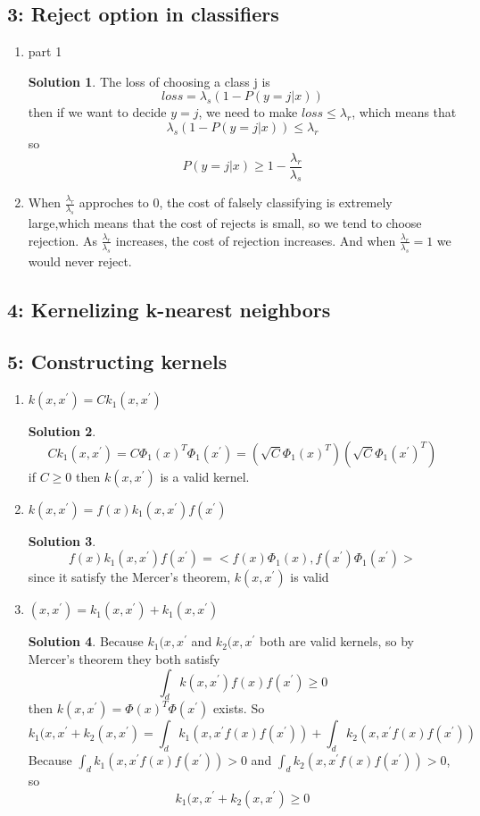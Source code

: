 \documentclass[]{book}
\theoremstyle{definition}
\newtheorem*{soln}{Solution}
\begin{document}
\subsection*{3: Reject option in classifiers  }
\begin{enumerate}
	\item part 1
	\begin{soln}
		The loss of choosing a class j is 
		$$loss = \lambda_s (1 - P(y = j | x))$$
		then if we want to decide $y=j$, we need to make $loss \leq \lambda_r$, which means that
		$$\lambda_s(1 - P(y = j | x))\leq \lambda_r$$
		so
		$$ P(y = j | x)\geq 1- \frac{\lambda_r}{\lambda_s}$$
	\end{soln}
	\item When $\frac{\lambda_r}{\lambda_s}$ approches to 0, the cost of falsely classifying is extremely large,which means that the cost of rejects is small, so we tend to choose rejection.
	As  $\frac{\lambda_r}{\lambda_s}$ increases, the cost of rejection increases. And when $\frac{\lambda_r}{\lambda_s} = 1$ we would never reject.
\end{enumerate}
\subsection*{4: Kernelizing k-nearest neighbors  }
\subsection*{5: Constructing kernels  }
\begin{enumerate}
	\item $k(x,x^{'}) = C k_1(x,x^{'})$
	\begin{soln}
		$$C k_1(x,x^{'}) = C \Phi_1(x)^T \Phi_1(x^{'}) = (\sqrt{C}\Phi_1(x)^T)(\sqrt{C}\Phi_1(x^{'})^T)$$
		if $C\geq0$ then $k(x,x^{'})$ is a valid kernel.
	\end{soln}
	\item $k(x,x^{'}) = f(x) k_1(x,x^{'}) f(x^{'})$
	\begin{soln}
		$$f(x) k_1(x,x^{'})f(x^{'}) = <f(x)\Phi_1(x),  f(x^{'})\Phi_1(x^{'})>$$
		since it satisfy the Mercer's theorem, $k(x,x^{'})$ is valid
	\end{soln} 
	\item $(x,x^{'}) = k_1(x,x^{'}) + k_1(x,x^{'})$
	\begin{soln}
		Because $k_1(x,x^{'}$ and $k_2(x,x^{'}$ both are valid kernels, so by Mercer's theorem they both satisfy
		$$\int_d k(x,x^{'})f(x)f(x^{'})\geq0$$
		then $k(x,x^{'}) = \Phi(x)^T \Phi(x^{'})$ exists.
		So 
		$$k_1(x,x^{'} + k_2(x,x^{'}) = \int_d k_1(x,x^{'}f(x)f(x^{'})) + \int_d k_2(x,x^{'}f(x)f(x^{'}))$$
		Because $\int_d k_1(x,x^{'}f(x)f(x^{'})) > 0 $ and $\int_d k_2(x,x^{'}f(x)f(x^{'})) > 0 $, so
		$$k_1(x,x^{'} + k_2(x,x^{'}) \ge 0$$
	\end{soln}
\end{enumerate}
\end{document}

